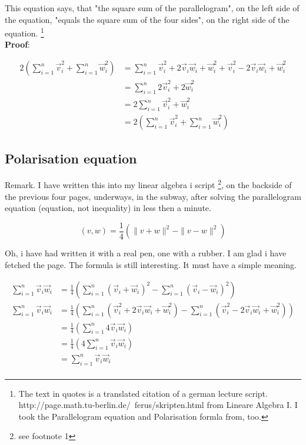 \documentclass[a4paper]{article}
\begin{document}
\begin{Example}
This equation says, that "the square sum of the parallelogram", on the left side of the equation, "equals the square sum of the four sides", on the right side of the equation. \footnote{The text in quotes is a translated citation of a german lecture script. http://page.math.tu-berlin.de/~ferus/skripten.html from Lineare Algebra I. I took the Parallelogram equation and Polarisation formla from, too.}\\

\textbf{Proof}:

\begin{displaymath}
\begin{align}
2(\sum_{i=1}^{n}\vec{v}_{i}^{2} + \sum_{i=1}^{n}\vec{w}_{i}^{2}) &= \sum_{i=1}^{n}\vec{v}_{i}^{2}+2\vec{v}_{i}\vec{w}_{i}+\vec{w}_{i}^{2}+\vec{v}_{i}^{2}-2\vec{v}_{i}\vec{w}_{i}+\vec{w}_{i}^{2}\\
&= \sum_{i=1}^{n}2\vec{v}_{i}^{2}+2\vec{w}_{i}^2\\ 
&= 2\sum_{i=1}^{n}\vec{v}_{i}^{2}+\vec{w}_{i}^{2} \\
&= 2(\sum_{i=1}^{n}\vec{v}_{i}^{2} + \sum_{i=1}^{n}\vec{w}_{i}^{2})
\end{align}
\end{displaymath}

\subsection{Polarisation equation}

Remark. I have written this into my linear algebra i script \cite{FerusLA}\footnote{see footnote 1}, on the backside of the previous four pages, underways, 
in the subway, after solving the parallelogram equation (equation, not inequality) in less then a minute. 

\begin{displaymath}
(v,w) = \frac{1}{4}(\|v+w\|^{2}-\|v-w\|^{2})
\end{displaymath}

Oh, i have had written it with a real pen, one with a rubber. I am glad i have fetched the page. The formula is still interesting.
It must have a simple meaning.

\begin{displaymath}
\begin{align}
\sum_{i=1}^{n}\vec{v}_{i}\vec{w}_{i} &= \frac{1}{4}(\sum_{i=1}^{n}(\vec{v}_{i}+\vec{w}_{i})^{2} - \sum_{i=1}^{n}(\vec{v}_{i}-\vec{w}_{i})^{2}) \\
\sum_{i=1}^{n}\vec{v}_{i}\vec{w}_{i} &= \frac{1}{4}(\sum_{i=1}^{n}(\vec{v}_{i}^{2}+2\vec{v}_{i}\vec{w}_{i}+\vec{w}_{i}^{2})-\sum_{i=1}^{n}(\vec{v}_{i}^{2}-2\vec{v}_{i}\vec{w}_{i}+\vec{w}_{i}^{2}))\\
&= \frac{1}{4}(\sum_{i=1}^{n}4\vec{v}_{i}\vec{w}_{i})\\
&= \frac{1}{4}(4\sum_{i=1}^{n}\vec{v}_{i}\vec{w}_{i})\\
&= \sum_{i=1}^{n}\vec{v}_{i}\vec{w}_{i}\\
\end{align}
\end{displaymath}


\end{Example}
\end{document}
